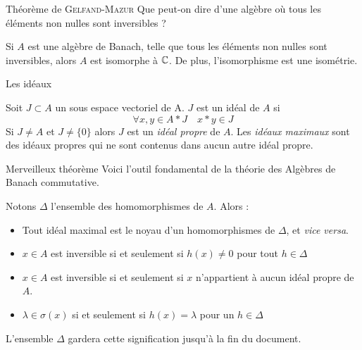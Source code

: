 \documentclass[11pt, draft]{beamer}
\begin{document}
\begin{frame}{Théorème de \textsc{Gelfand}-\textsc{Mazur}}
    Que peut-on dire d'une algèbre où tous les éléments non nulles sont inversibles ?

    \begin{myth}
        Si $A$ est une algèbre de Banach, telle que tous les éléments non nulles sont inversibles, alors $A$ est isomorphe à
        $\mathbb{C}$. De plus, l'isomorphisme est une isométrie.  
    \end{myth}
\end{frame}

\begin{frame}{Les idéaux}
    \begin{mydef}[Idéal]
        Soit $J \subset A$ un sous espace vectoriel de A. $J$ est un idéal de $A$ si 
        \[
            \forall x, y \in A*J \quad x*y \in J
        \] 
        Si $J \not = A$ et $J \not = \{0\}$ alors $J$ est un \emph{idéal propre} de $A$. Les \emph{idéaux maximaux} sont des idéaux propres qui ne sont
        contenus dans aucun autre idéal propre.
    \end{mydef}
\end{frame}

\begin{frame}{Merveilleux théorème}
    Voici l'outil fondamental de la théorie des Algèbres de Banach commutative.

       \begin{myth}
           Notons $\Delta$ l'ensemble des homomorphismes de $A$. Alors :
           \begin{itemize}[<+->]
               \item Tout idéal maximal est le noyau d'un homomorphismes de $\Delta$, et \emph{vice versa}.
               \item $x \in A$ est inversible si et seulement si $h(x) \not = 0$ pour tout $h \in \Delta$
               \item $x \in A$ est inversible si et seulement si $x$ n'appartient à aucun idéal propre de $A$.
               \item $\lambda \in \sigma(x) $  si et seulement si $h(x) = \lambda $ pour un $h \in \Delta$
           \end{itemize}

           L'ensemble $\Delta$ gardera cette signification jusqu'à la fin du document.
       \end{myth} 
\end{frame}
\end{document}
